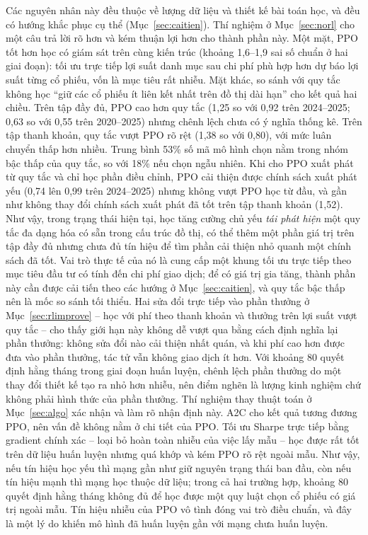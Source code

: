 Các nguyên nhân này đều thuộc về lượng dữ liệu và thiết kế bài toán học, và đều có hướng khắc phục cụ thể (Mục~\ref{sec:caitien}). Thí nghiệm ở Mục~\ref{sec:norl} cho một câu trả lời rõ hơn và kém thuận lợi hơn cho thành phần này. Một mặt, PPO tốt hơn học có giám sát trên cùng kiến trúc (khoảng 1,6--1,9 sai số chuẩn ở hai giai đoạn): tối ưu trực tiếp lợi suất danh mục sau chi phí phù hợp hơn dự báo lợi suất từng cổ phiếu, vốn là mục tiêu rất nhiễu. Mặt khác, so sánh với quy tắc không học ``giữ các cổ phiếu ít liên kết nhất trên đồ thị dài hạn'' cho kết quả hai chiều. Trên tập đầy đủ, PPO cao hơn quy tắc (1,25 so với 0,92 trên 2024--2025; 0,63 so với 0,55 trên 2020--2025) nhưng chênh lệch chưa có ý nghĩa thống kê. Trên tập thanh khoản, quy tắc vượt PPO rõ rệt (1,38 so với 0,80), với mức luân chuyển thấp hơn nhiều. Trung bình 53\% số mã mô hình chọn nằm trong nhóm bậc thấp của quy tắc, so với 18\% nếu chọn ngẫu nhiên. Khi cho PPO xuất phát từ quy tắc và chỉ học phần điều chỉnh, PPO cải thiện được chính sách xuất phát yếu (0,74 lên 0,99 trên 2024--2025) nhưng không vượt PPO học từ đầu, và gần như không thay đổi chính sách xuất phát đã tốt trên tập thanh khoản (1,52). Như vậy, trong trạng thái hiện tại, học tăng cường chủ yếu \emph{tái phát hiện} một quy tắc đa dạng hóa có sẵn trong cấu trúc đồ thị, có thể thêm một phần giá trị trên tập đầy đủ nhưng chưa đủ tín hiệu để tìm phần cải thiện nhỏ quanh một chính sách đã tốt. Vai trò thực tế của nó là cung cấp một khung tối ưu trực tiếp theo mục tiêu đầu tư có tính đến chi phí giao dịch; để có giá trị gia tăng, thành phần này cần được cải tiến theo các hướng ở Mục~\ref{sec:caitien}, và quy tắc bậc thấp nên là mốc so sánh tối thiểu. Hai sửa đổi trực tiếp vào phần thưởng ở Mục~\ref{sec:rlimprove} -- học với phí theo thanh khoản và thưởng trên lợi suất vượt quy tắc -- cho thấy giới hạn này không dễ vượt qua bằng cách định nghĩa lại phần thưởng: không sửa đổi nào cải thiện nhất quán, và khi phí cao hơn được đưa vào phần thưởng, tác tử vẫn không giao dịch ít hơn. Với khoảng 80 quyết định hằng tháng trong giai đoạn huấn luyện, chênh lệch phần thưởng do một thay đổi thiết kế tạo ra nhỏ hơn nhiễu, nên điểm nghẽn là lượng kinh nghiệm chứ không phải hình thức của phần thưởng. Thí nghiệm thay thuật toán ở Mục~\ref{sec:algo} xác nhận và làm rõ nhận định này. A2C cho kết quả tương đương PPO, nên vấn đề không nằm ở chi tiết của PPO. Tối ưu Sharpe trực tiếp bằng gradient chính xác -- loại bỏ hoàn toàn nhiễu của việc lấy mẫu -- học được rất tốt trên dữ liệu huấn luyện nhưng quá khớp và kém PPO rõ rệt ngoài mẫu. Như vậy, nếu tín hiệu học yếu thì mạng gần như giữ nguyên trạng thái ban đầu, còn nếu tín hiệu mạnh thì mạng học thuộc dữ liệu; trong cả hai trường hợp, khoảng 80 quyết định hằng tháng không đủ để học được một quy luật chọn cổ phiếu có giá trị ngoài mẫu. Tín hiệu nhiễu của PPO vô tình đóng vai trò điều chuẩn, và đây là một lý do khiến mô hình đã huấn luyện gần với mạng chưa huấn luyện.

